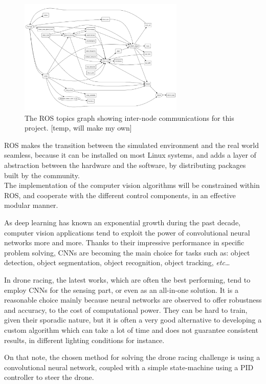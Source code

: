 \begin{figure}[h]
	\centering
	\includegraphics[width=0.7\textwidth]{figure/ros_topics.png}
	\caption{The ROS topics graph showing inter-node communications for this
	project. [temp, will make my own]}
	\label{fig:ros-topics}
\end{figure}

ROS makes the transition between the simulated environment and the real world
seamless, because it can be installed on most Linux systems, and adds a layer
of abstraction between the hardware and the software, by distributing packages
built by the community.\\

The implementation of the computer vision algorithms will be constrained within
ROS, and cooperate with the different control components, in an effective
modular manner.\\



As deep learning has known an exponential growth during the past decade,
computer vision applications tend to exploit the power of convolutional neural
networks more and more. Thanks to their impressive performance in specific
problem solving, CNNs are becoming the main choice for tasks such as: object
detection, object segmentation, object recognition, object tracking,
\emph{etc}\ldots

In drone racing, the latest works, which are often the best performing, tend to
employ CNNs for the sensing part, or even as an all-in-one solution. It is a
reasonable choice mainly because neural networks are observed to offer
robustness and accuracy, to the cost of computational power. They can be hard
to train, given their sporadic nature, but it is often a very good alternative
to developing a custom algorithm which can take a lot of time and does not
guarantee consistent results, in different lighting conditions for instance.

On that note, the chosen method for solving the drone racing challenge is
using a convolutional neural network, coupled with a simple state-machine 
using a PID controller to steer the drone.
